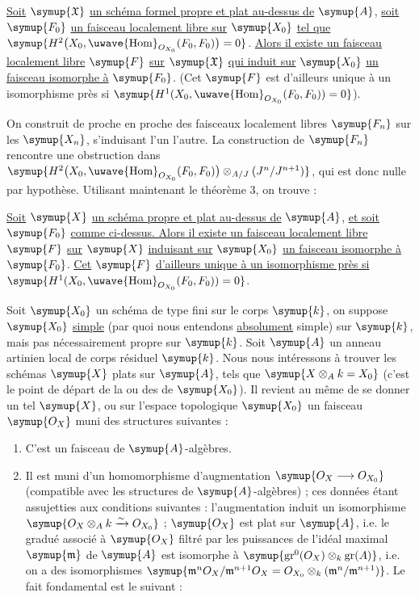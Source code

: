  \uline{Soit} $\symup{\mathfrak X}$ \uline{un schéma formel propre et plat
au-dessus de} $\symup{A}$, \uline{soit} $\symup{F_0}$ \uline{un faisceau localement libre sur} $\symup{X_0}$ \uline{tel que}
$\symup{H^2\bigl(X_0,\mathop{\text{\uwave{Hom}}}\nolimits_{O_{X_0}}(F_0,F_0)\bigr)=0}$.
\uline{Alors il existe un faisceau localement libre} $\symup{F}$ \uline{sur} $\symup{\mathfrak X}$ \uline{qui induit
sur} $\symup{X_0}$ \uline{un faisceau isomorphe à} $\symup{F_0}$. (Cet $\symup{F}$ est d'ailleurs unique à un
isomorphisme près si
$\symup{H^1(X_0,\mathop{\text{\uwave{Hom}}}\nolimits_{O_{X_0}}(F_0,F_0))=0}$).

On construit de proche en proche des faisceaux localement libres $\symup{F_n}$ sur les
$\symup{X_n}$, s'induisant l'un l'autre. La construction de $\symup{F_n}$ rencontre une
obstruction dans
$\symup{H^2\bigl(X_0,\mathop{\text{\uwave{Hom}}}\nolimits_{O_{X_0}}(F_0,F_0)\bigr) \otimes_{A/J}(J^n/J^{n+1})}$,
qui est donc nulle par hypothèse. Utilisant maintenant le théorème 3, on
trouve :

 \uline{Soit} $\symup{X}$ \uline{un schéma propre et plat au-dessus de} $\symup{A}$, \uline{et
soit} $\symup{F_0}$ \uline{comme ci-dessus. Alors il existe un faisceau localement libre} $\symup{F}$
\uline{sur} $\symup{X}$ \uline{induisant sur} $\symup{X_0}$ \uline{un faisceau isomorphe à} $\symup{F_0}$. \uline{Cet} $\symup{F}$
\uline{d'ailleurs unique à un isomorphisme près si}
$\symup{H^1(X_0,\mathop{\text{\uwave{Hom}}}\nolimits_{O_{X_0}}(F_0,F_0))=0}$.

Soit $\symup{X_0}$ un schéma de type fini sur le corps $\symup{k}$, on suppose $\symup{X_0}$ \uline{simple}
(par quoi nous entendons \uline{absolument} simple) sur $\symup{k}$, mais pas nécessairement
propre sur $\symup{k}$. Soit $\symup{A}$ un anneau artinien local de corps résiduel $\symup{k}$. Nous
nous intéressons à trouver les schémas $\symup{X}$ plats sur $\symup{A}$, tels que
$\symup{X\otimes_A k=X_0}$ (c'est le point de départ de la  ou
des  de $\symup{X_0}$). Il revient au même de se donner un
tel $\symup{X}$, ou sur l'espace topologique $\symup{X_0}$ un faisceau $\symup{O_X}$ muni des
structures suivantes :
\begin{enumerate}
  \item[\textnormal{i.}] C'est un faisceau de $\symup{A}$-algèbres.
  \item[\textnormal{ii.}] Il est muni d'un homomorphisme d'augmentation
    $\symup{O_X\longrightarrow O_{X_0}}$ (compatible avec les structures de
    $\symup{A}$-algèbres) ; ces données étant assujetties aux conditions suivantes :
    l'augmentation induit un isomorphisme
    $\symup{O_X\otimes_A k\xrightarrow{\sim}O_{X_0}}$ ; $\symup{O_X}$ est plat sur
    $\symup{A}$, i.e. le gradué associé à $\symup{O_X}$ filtré par les puissances de l'idéal
    maximal $\symup{\mathfrak m}$ de $\symup{A}$ est isomorphe à
    $\symup{\operatorname{gr}^0(O_X)\otimes_k\operatorname{gr}(A)}$, i.e. on a des
    isomorphismes
    $\symup{\mathfrak m^nO_X/\mathfrak m^{n+1}O_X =O_{X_0}\otimes_k(\mathfrak m^n/\mathfrak m^{n+1})}$.
Le fait fondamental est le suivant :
\end{enumerate}

